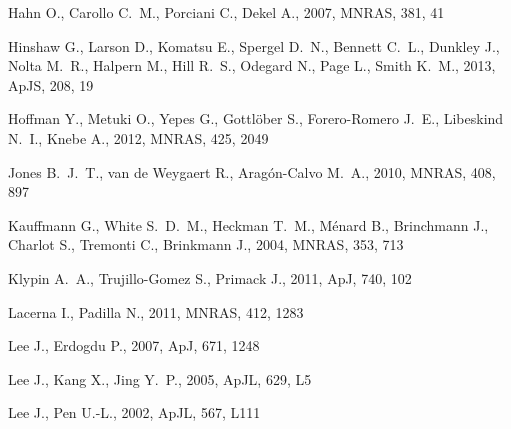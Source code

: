 \documentclass[useAMS,usenatbib]{mn2e}
\newcommand{\apj}{ApJ}
\newcommand{\apjs}{ApJS}
\newcommand{\apjl}{ApJL}
\newcommand{\mnras}{MNRAS}
\begin{document}
\begin{thebibliography}{}
{Hahn} O.,  {Carollo} C.~M.,  {Porciani} C.,    {Dekel} A.,  2007, \mnras, 381,
  41

{Hinshaw} G.,  {Larson} D.,  {Komatsu} E.,  {Spergel} D.~N.,  {Bennett} C.~L.,
  {Dunkley} J.,  {Nolta} M.~R.,  {Halpern} M.,  {Hill} R.~S.,  {Odegard} N.,
  {Page} L.,    {Smith} K.~M.,  2013, \apjs, 208, 19

{Hoffman} Y.,  {Metuki} O.,  {Yepes} G.,  {Gottl{\"o}ber} S.,  {Forero-Romero}
  J.~E.,  {Libeskind} N.~I.,    {Knebe} A.,  2012, \mnras, 425, 2049

{Jones} B.~J.~T.,  {van de Weygaert} R.,    {Arag{\'o}n-Calvo} M.~A.,  2010,
  \mnras, 408, 897

{Kauffmann} G.,  {White} S.~D.~M.,  {Heckman} T.~M.,  {M{\'e}nard} B.,
  {Brinchmann} J.,  {Charlot} S.,  {Tremonti} C.,    {Brinkmann} J.,  2004,
  \mnras, 353, 713

{Klypin} A.~A.,  {Trujillo-Gomez} S.,    {Primack} J.,  2011, \apj, 740, 102

{Lacerna} I.,  {Padilla} N.,  2011, \mnras, 412, 1283

{Lee} J.,  {Erdogdu} P.,  2007, \apj, 671, 1248

{Lee} J.,  {Kang} X.,    {Jing} Y.~P.,  2005, \apjl, 629, L5

{Lee} J.,  {Pen} U.-L.,  2002, \apjl, 567, L111


\end{thebibliography}
\end{document}
